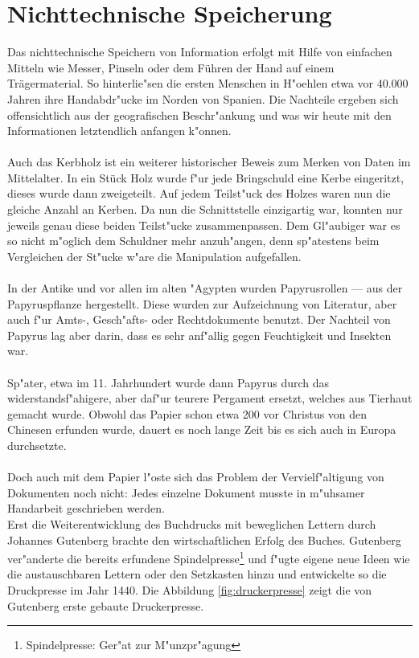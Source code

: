 
\chapter{Nichttechnische Speicherung}
\label{ch:Nichttechnische Speicherung}
Das nichttechnische Speichern von Information erfolgt mit Hilfe von einfachen Mitteln wie Messer, Pinseln oder dem Führen der Hand auf einem Trägermaterial. So hinterlie"sen die ersten Menschen in H"oehlen etwa vor 40.000 Jahren ihre Handabdr"ucke im Norden von Spanien\cite{spiegel:hoehle}. Die Nachteile ergeben sich offensichtlich aus der geografischen Beschr"ankung und was wir heute mit den Informationen letztendlich anfangen k"onnen.
\\
\\
Auch das Kerbholz ist ein weiterer historischer Beweis zum Merken von Daten im Mittelalter. In ein Stück Holz wurde f"ur jede Bringschuld eine Kerbe eingeritzt, dieses wurde dann zweigeteilt. Auf jedem Teilst"uck des Holzes waren nun die gleiche Anzahl an Kerben. Da nun die Schnittstelle einzigartig war, konnten nur jeweils genau diese beiden Teilst"ucke zusammenpassen. Dem Gl"aubiger war es so nicht m"oglich dem Schuldner mehr anzuh"angen, denn sp"atestens beim Vergleichen der St"ucke w"are die Manipulation aufgefallen.\cite{carlen:kerbholz} 
\\
\\
In der Antike und vor allen im alten "Agypten wurden Papyrusrollen --- aus der Papyruspflanze hergestellt. Diese wurden zur Aufzeichnung von Literatur, aber auch f"ur Amts-, Gesch"afts- oder Rechtdokumente benutzt. Der Nachteil von Papyrus lag aber darin, dass es sehr anf"allig gegen Feuchtigkeit und Insekten war.
\\
\\
Sp"ater, etwa im 11. Jahrhundert wurde dann Papyrus durch das widerstandsf"ahigere, aber daf"ur teurere Pergament ersetzt, welches aus Tierhaut gemacht wurde.
Obwohl das Papier schon etwa 200 vor Christus von den Chinesen erfunden wurde, dauert es noch lange Zeit bis es sich auch in Europa durchsetzte.
\\
\\
Doch auch mit dem Papier l"oste sich das Problem der Vervielf"altigung von Dokumenten noch nicht: 
Jedes einzelne Dokument musste in m"uhsamer Handarbeit geschrieben werden. 
\\
Erst die Weiterentwicklung des Buchdrucks mit beweglichen Lettern durch Johannes Gutenberg brachte den wirtschaftlichen Erfolg des Buches.
Gutenberg ver"anderte die bereits erfundene Spindelpresse\footnote[3]{Spindelpresse: Ger"at zur M"unzpr"agung} und f"ugte eigene neue Ideen wie die austauschbaren Lettern oder den Setzkasten hinzu und entwickelte so die Druckpresse im Jahr 1440. Die Abbildung \ref{fig:druckerpresse} zeigt die von Gutenberg erste gebaute Druckerpresse.

